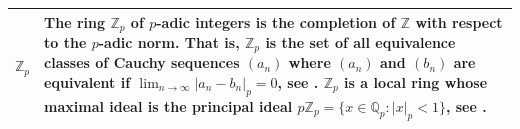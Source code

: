 \documentclass[12pt]{amsart}
\theoremstyle{definition}
\begin{document}
{\begin{table}[H]
\begin{tabular}{|P{1.4cm} p{13.4cm}|}
		\\
		$\mathbb{Z}_p$ & The ring $\mathbb{Z}_p$ of $p$-adic integers is the completion of $\mathbb{Z}$ with respect to the $p$-adic norm. That is, $\mathbb{Z}_p$ is the set of all equivalence classes of Cauchy sequences $(a_n)$ where $(a_n)$ and $(b_n)$ are equivalent if $\lim_{n\to\infty}|a_n-b_n|_p=0$, see \cite{Ref_Gupta_2018}. $\mathbb{Z}_p$ is a local ring whose maximal ideal is the principal ideal $p\mathbb{Z}_p=\{x\in\mathbb{Q}_p:|x|_p<1\}$, see \cite[p.~74]{Ref_Gouvea_2020}.
		\\ \hline
	\end{tabular}
\end{table}}



\vspace{1em}


\end{document}

